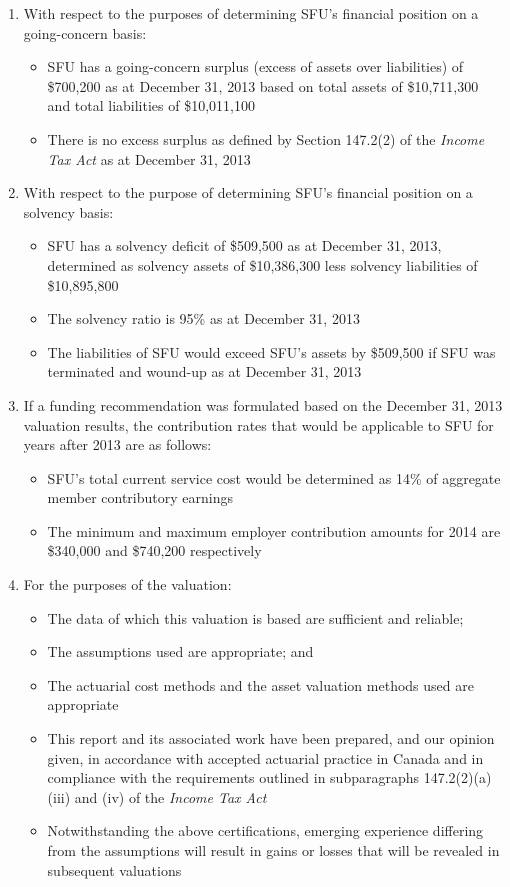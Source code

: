 \documentclass{report}
\begin{document}
\vspace{3mm}
\begin{enumerate}
\item[\color{bleu}\LARGE\bf1. ] With respect to the purposes of determining SFU's financial position on a going-concern basis:
\begin{itemize}
\item SFU has a going-concern surplus (excess of assets over liabilities) of \$700,200 as at December 31, 2013 based on total assets of \$10,711,300 and total liabilities of \$10,011,100
\item There is no excess surplus as defined by Section 147.2(2) of the \textit{Income Tax Act} as at December 31, 2013 
\end{itemize}
\item[\color{bleu}\LARGE\bf2. ] With respect to the  purpose of determining SFU's financial position on a solvency basis:
\begin{itemize}
\item SFU has a solvency deficit of \$509,500 as at December 31, 2013, determined as solvency assets of \$10,386,300 less solvency liabilities of \$10,895,800
\item The solvency ratio is 95\% as at December 31, 2013
\item The liabilities of SFU would exceed SFU's assets by \$509,500 if SFU was terminated and wound-up as at December 31, 2013
\end{itemize}
\item[\color{bleu}\LARGE\bf3. ] If a funding recommendation was formulated based on the December 31, 2013 valuation results, the contribution rates that would be applicable to SFU for years after 2013 are as follows:
\begin{itemize}
\item SFU's total current service cost would be determined as 14\% of aggregate member contributory earnings
\item The minimum and maximum employer contribution amounts for 2014 are \$340,000 and \$740,200 respectively
\end{itemize}
\item[\color{bleu}\LARGE\bf4. ] For the purposes of the valuation:
\begin{itemize}
\item The data of which this valuation is based are sufficient and reliable;
\item The assumptions used are appropriate; and
\item The actuarial cost methods and the asset valuation methods used are appropriate
\item[\color{bleu}\LARGE\bf5. ] This report and its associated work have been prepared, and our opinion given, in accordance with accepted actuarial practice in Canada and in compliance with the requirements outlined in subparagraphs 147.2(2)(a)(iii) and (iv) of the \textit{Income Tax Act}
\item[\color{bleu}\LARGE\bf6. ] Notwithstanding the above certifications, emerging experience differing from the assumptions will result in gains or losses that will be revealed in subsequent valuations
\end{itemize}
\end{enumerate}
\end{document}
